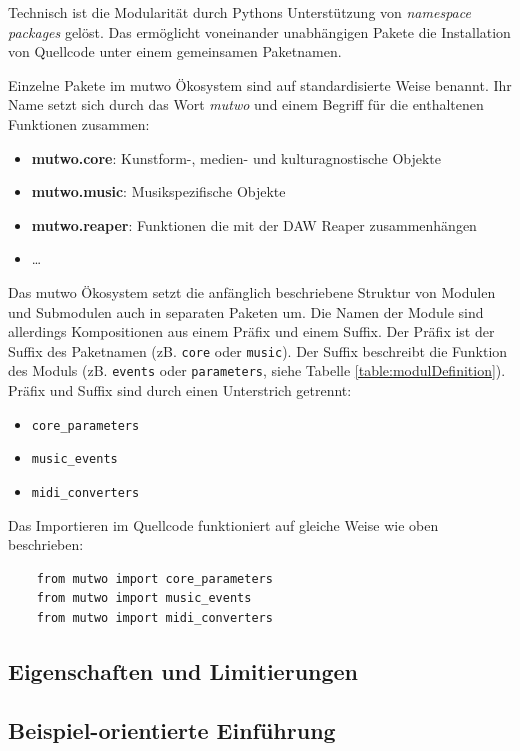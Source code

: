 \documentclass[12pt,a4paper,ngerman]{article}
\begin{document}
Technisch ist die Modularität durch Pythons Unterstützung von \emph{namespace packages} gelöst.
Das ermöglicht voneinander unabhängigen Pakete die Installation von Quellcode unter einem gemeinsamen Paketnamen.

Einzelne Pakete im mutwo Ökosystem sind auf standardisierte Weise benannt.
Ihr Name setzt sich durch das Wort \emph{mutwo} und einem Begriff für die enthaltenen Funktionen zusammen:

\begin{itemize}
    \item{\textbf{mutwo.core}: Kunstform-, medien- und kulturagnostische Objekte}
    \item{\textbf{mutwo.music}: Musikspezifische Objekte}
    \item{\textbf{mutwo.reaper}: Funktionen die mit der DAW Reaper zusammenhängen}
    \item{\dots}
\end{itemize}

Das mutwo Ökosystem setzt die anfänglich beschriebene Struktur von Modulen und Submodulen auch in separaten Paketen um.
Die Namen der Module sind allerdings Kompositionen aus einem Präfix und einem Suffix.
Der Präfix ist der Suffix des Paketnamen (zB. \texttt{core} oder \texttt{music}).
Der Suffix beschreibt die Funktion des Moduls (zB. \texttt{events} oder \texttt{parameters}, siehe Tabelle \ref{table:modulDefinition}).
Präfix und Suffix sind durch einen Unterstrich getrennt:

\begin{itemize}
    \item{\texttt{core\_parameters}}
    \item{\texttt{music\_events}}
    \item{\texttt{midi\_converters}}
\end{itemize}

Das Importieren im Quellcode funktioniert auf gleiche Weise wie oben beschrieben:


\begin{lstlisting}
    from mutwo import core_parameters
    from mutwo import music_events
    from mutwo import midi_converters
\end{lstlisting}

\subsection{Eigenschaften und Limitierungen}

\subsection{Beispiel-orientierte Einführung}
\end{document}
